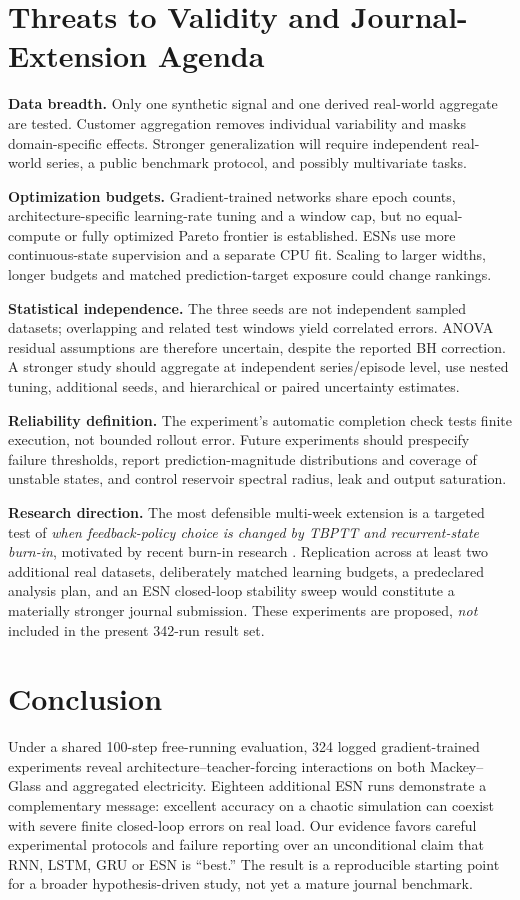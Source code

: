 \documentclass[final,5p,times,twocolumn]{elsarticle}
\begin{document}
\section{Threats to Validity and Journal-Extension Agenda}

\textbf{Data breadth.} Only one synthetic signal and one derived real-world aggregate are tested. Customer aggregation removes individual variability and masks domain-specific effects. Stronger generalization will require independent real-world series, a public benchmark protocol, and possibly multivariate tasks.

\textbf{Optimization budgets.} Gradient-trained networks share epoch counts, architecture-specific learning-rate tuning and a window cap, but no equal-compute or fully optimized Pareto frontier is established. ESNs use more continuous-state supervision and a separate CPU fit. Scaling to larger widths, longer budgets and matched prediction-target exposure could change rankings.

\textbf{Statistical independence.} The three seeds are not independent sampled datasets; overlapping and related test windows yield correlated errors. ANOVA residual assumptions are therefore uncertain, despite the reported BH correction. A stronger study should aggregate at independent series/episode level, use nested tuning, additional seeds, and hierarchical or paired uncertainty estimates.

\textbf{Reliability definition.} The experiment's automatic completion check tests finite execution, not bounded rollout error. Future experiments should prespecify failure thresholds, report prediction-magnitude distributions and coverage of unstable states, and control reservoir spectral radius, leak and output saturation.

\textbf{Research direction.} The most defensible multi-week extension is a targeted test of \emph{when feedback-policy choice is changed by TBPTT and recurrent-state burn-in}, motivated by recent burn-in research \cite{schiller2026burnin}. Replication across at least two additional real datasets, deliberately matched learning budgets, a predeclared analysis plan, and an ESN closed-loop stability sweep would constitute a materially stronger journal submission. These experiments are proposed, \emph{not} included in the present 342-run result set.

\section{Conclusion}
Under a shared 100-step free-running evaluation, 324 logged gradient-trained experiments reveal architecture--teacher-forcing interactions on both Mackey--Glass and aggregated electricity. Eighteen additional ESN runs demonstrate a complementary message: excellent accuracy on a chaotic simulation can coexist with severe finite closed-loop errors on real load. Our evidence favors careful experimental protocols and failure reporting over an unconditional claim that RNN, LSTM, GRU or ESN is ``best.'' The result is a reproducible starting point for a broader hypothesis-driven study, not yet a mature journal benchmark.
\end{document}

